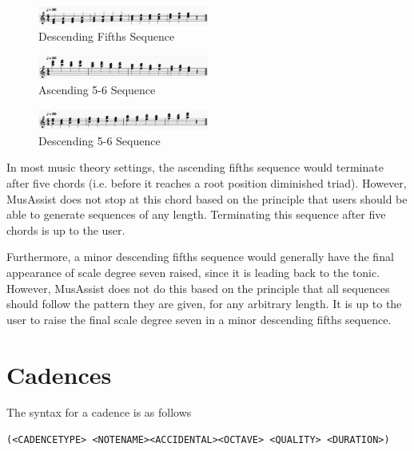 \documentclass{report}
\begin{document}
\begin{figure}[h!]
\centering
\includegraphics[width=0.5\textwidth]{images/descfifths}
  \caption{Descending Fifths Sequence}
\end{figure}

\begin{figure}[h!]
\centering
\includegraphics[width=0.5\textwidth]{images/asc56}
  \caption{Ascending 5-6 Sequence}
\end{figure}

\begin{figure}[h!]
\centering
\includegraphics[width=0.5\textwidth]{images/desc56}
  \caption{Descending 5-6 Sequence}
\end{figure}

\newpage

In most music theory settings, the ascending fifths sequence would terminate after five chords (i.e. before it reaches a root position diminished  triad). However, MusAssist does not stop at this chord based on the principle that users should be able to generate sequences of any length. Terminating this sequence after five chords is up to the user.

Furthermore, a minor descending fifths sequence would generally have the final appearance of scale degree seven raised, since it is leading back to the tonic. However, MusAssist does not do this based on the principle that all sequences should follow the pattern they are given, for any arbitrary length. It is up to the user to raise the final scale degree seven in a minor descending fifths sequence.


\section{Cadences}

The syntax for a cadence is as follows

\begin{verbatim}
(<CADENCETYPE> <NOTENAME><ACCIDENTAL><OCTAVE> <QUALITY> <DURATION>)
\end{verbatim}
\end{document}

